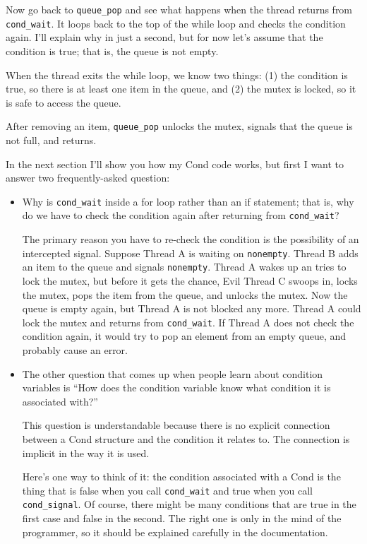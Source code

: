 \documentclass[12pt]{book}
\begin{document}
Now go back to \verb"queue_pop" and see what happens when the thread
returns from \verb"cond_wait".  It loops back to the top of the while
loop and checks the condition again.  I'll explain why in just a
second, but for now let's assume that the condition is true; that is,
the queue is not empty.

When the thread exits the while loop, we know two things: (1) the condition
is true, so there is at least one item in the queue, and (2) the mutex
is locked, so it is safe to access the queue.

After removing an item, \verb"queue_pop" unlocks the mutex, signals
that the queue is not full, and returns.

In the next section I'll show you how my Cond code works, but first I
want to answer two frequently-asked question:

\begin{itemize}

\item Why is \verb"cond_wait" inside a for loop rather than an if
statement; that is, why do we have to check the condition again after
returning from \verb"cond_wait"?

The primary reason you have to re-check the condition is the possibility
of an intercepted signal.  Suppose Thread A is waiting on {\tt nonempty}.
Thread B adds an item to the queue and signals {\tt nonempty}.  Thread
A wakes up an tries to lock the mutex, but before it gets the chance,
Evil Thread C swoops in, locks the mutex, pops the item from the
queue, and unlocks the mutex.  Now the queue is empty again, but
Thread A is not blocked any more.  Thread A could lock the mutex and
returns from \verb"cond_wait".  If Thread A does not check the condition
again, it would try to pop an element from an empty queue, and probably
cause an error.

\item The other question that comes up when people learn about condition
variables is ``How does the condition variable know what condition it
is associated with?''

This question is understandable because there is no explicit connection
between a Cond structure and the condition it relates to.  The
connection is implicit in the way it is used.

Here's one way to think of it: the condition associated with a Cond
is the thing that is false when you call \verb"cond_wait" and true
when you call \verb"cond_signal".  Of course, there might be many
conditions that are true in the first case and false in the second.
The right one is only in the mind of the programmer, so it should be
explained carefully in the documentation.

\end{itemize}
\end{document}
